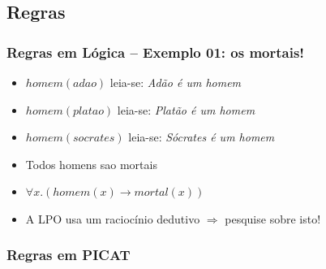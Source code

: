 \documentclass[10pt]{beamer}
\begin{document}
\subsection{Regras}
\begin{frame}
    \frametitle{Regras  em Lógica -- Exemplo 01: os mortais!}
    \begin{itemize}
    \item $homem(adao)$ \hspace{2cm} leia-se: \textit{Adão é um homem}         
    \item $homem(platao)$ \hspace{2cm} leia-se: \textit{Platão é um homem}
    \item $homem(socrates)$ \hspace{2cm} leia-se: \textit{Sócrates é um homem}
    \pause 
     
    \item Todos homens sao mortais
    \pause
    \item $\forall x . (homem(x) \rightarrow mortal(x))$
    \item A LPO usa um raciocínio dedutivo $\Rightarrow $ pesquise sobre isto!

    \end{itemize}
\end{frame}

\begin{frame}[allowframebreaks=0.9]
\frametitle{Regras em PICAT}



\end{frame}

\end{document}
